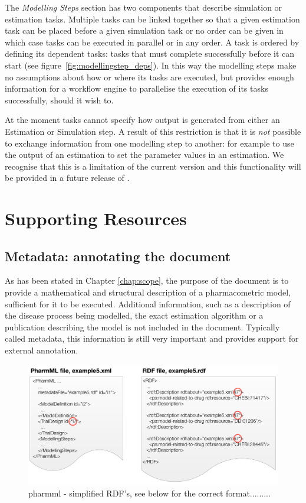 The \emph{Modelling Steps} section has two components that describe
simulation or estimation tasks. Multiple tasks can be linked together so
that a given estimation task can be placed before a given simulation
task or no order can be given in which case tasks can be executed in
parallel or in any order. A task is ordered by defining its dependent
tasks: tasks that must complete successfully before it can start (see
figure~\ref{fig:modellingstep_deps}). In this way the modelling steps
make no assumptions about how or where its tasks are executed, but
provides enough information for a workflow engine to parallelise the
execution of its tasks successfully, should it wish to.

At the moment tasks cannot specify how output is generated from either
an Estimation or Simulation step. A result of this restriction is that
it is \emph{not} possible to exchange information from one modelling
step to another: for example to use the output of an estimation to set
the parameter values in an estimation. We recognise that this is a
limitation of the current version and this functionality will be
provided in a future release of \pharmml.


\section{Supporting Resources}
\label{sec:supporting-res}

\subsection{Metadata: annotating the \pharmml document}
\label{sec:annotation}

As has been stated in Chapter \ref{chap:scope}, the purpose of
the \pharmml document is to provide a mathematical and structural
description of a pharmacometric model, sufficient for it to be
executed. Additional information, such as a description of the disease
process being modelled, the exact estimation algorithm or a
publication describing the model is not included in the \pharmml
document. Typically called metadata, this information is still very 
important and \pharmml provides support for external annotation.

\begin{figure}[htbp]
\centering
\includegraphics[width=0.8\linewidth]{pics/PharmML_RDF.pdf}
\caption{pharmml - simplified RDF's, see below for the correct format.........}
\label{fig:pharmmlRdf}
\end{figure}

